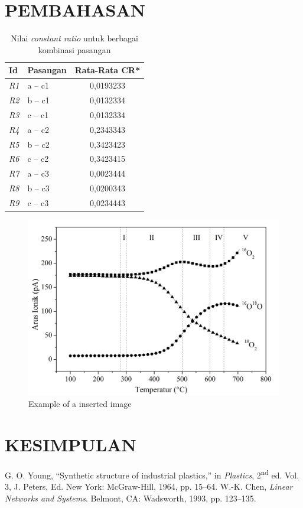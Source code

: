 \documentclass[12pt,a4paper]{article}
\begin{document}
\begin{multicols}{2}
\section{PEMBAHASAN}
\begin{table}[H]
  \centering
  \caption{Nilai \textit{constant ratio} untuk berbagai kombinasi pasangan}
  \label{tab:cr}
  \begin{tabular}{l l c}
  \toprule
  \textbf{Id} & \textbf{Pasangan} & \textbf{Rata-Rata CR*} \\
  \midrule
  \textit{R1} & a -- c1 & 0,0193233 \\
  \textit{R2} & b -- c1 & 0,0132334 \\
  \textit{R3} & c -- c1 & 0,0132334 \\
  \textit{R4} & a -- c2 & 0,2343343 \\
  \textit{R5} & b -- c2 & 0,3423423 \\
  \textit{R6} & c -- c2 & 0,3423415 \\
  \textit{R7} & a -- c3 & 0,0023444 \\
  \textit{R8} & b -- c3 & 0,0200343 \\
  \textit{R9} & c -- c3 & 0,0234443 \\
  \bottomrule
  \end{tabular}
  \end{table}
\lipsum
\begin{figure}[H]
  \centering
  \includegraphics[width=0.7\linewidth]{fig1.png}
  \caption{Example of a inserted image}
  \label{fig:example}
\end{figure}
\section{KESIMPULAN}
\lipsum
\printbibliography[heading=bibliography]

\begin{thebibliography}{99}
G. O. Young, ``Synthetic structure of industrial plastics,'' in \textit{Plastics}, 2\textsuperscript{nd} ed. Vol. 3, J. Peters, Ed. New York: McGraw-Hill, 1964, pp. 15--64.
W.-K. Chen, \textit{Linear Networks and Systems}. Belmont, CA: Wadsworth, 1993, pp. 123--135.
\end{thebibliography}

\end{multicols}
\end{document}
